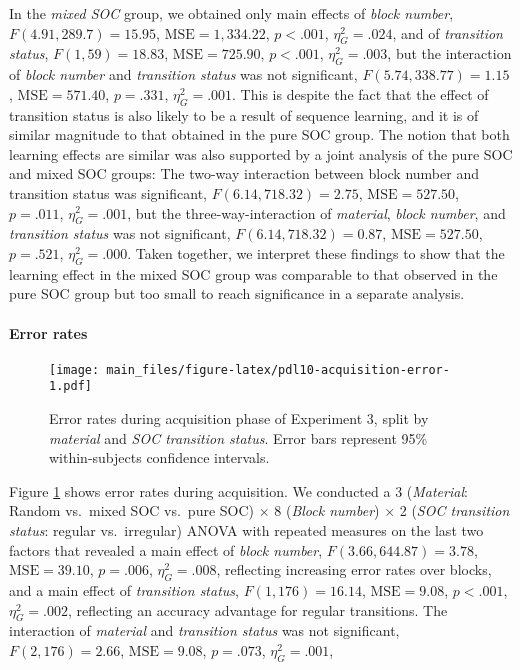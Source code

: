\documentclass[man]{apa6}
\theoremstyle{definition}
\theoremstyle{definition}
\theoremstyle{definition}
\theoremstyle{remark}
\begin{document}
In the \emph{mixed SOC} group, we obtained only main effects of
\emph{block number}, \(F(4.91, 289.7) = 15.95\),
\(\mathrm{MSE} = 1,334.22\), \(p < .001\), \(\eta^2_G = .024\), and of
\emph{transition status}, \(F(1, 59) = 18.83\),
\(\mathrm{MSE} = 725.90\), \(p < .001\), \(\eta^2_G = .003\), but the
interaction of \emph{block number} and \emph{transition status} was not
significant, \(F(5.74, 338.77) = 1.15\), \(\mathrm{MSE} = 571.40\),
\(p = .331\), \(\eta^2_G = .001\). This is despite the fact that the
effect of transition status is also likely to be a result of sequence
learning, and it is of similar magnitude to that obtained in the pure
SOC group. The notion that both learning effects are similar was also
supported by a joint analysis of the pure SOC and mixed SOC groups: The
two-way interaction between block number and transition status was
significant, \(F(6.14, 718.32) = 2.75\), \(\mathrm{MSE} = 527.50\),
\(p = .011\), \(\eta^2_G = .001\), but the three-way-interaction of
\emph{material}, \emph{block number}, and \emph{transition status} was
not significant, \(F(6.14, 718.32) = 0.87\), \(\mathrm{MSE} = 527.50\),
\(p = .521\), \(\eta^2_G = .000\). Taken together, we interpret these
findings to show that the learning effect in the mixed SOC group was
comparable to that observed in the pure SOC group but too small to reach
significance in a separate analysis.

\paragraph{Error rates}\label{error-rates-2}

\begin{figure}[htbp]
\centering
\texttt{[image: main\_files/figure-latex/pdl10-acquisition-error-1.pdf]}
\caption{\label{fig:pdl10-acquisition-error}Error rates during acquisition
phase of Experiment 3, split by \emph{material} and \emph{SOC transition
status}. Error bars represent 95\% within-subjects confidence
intervals.}
\end{figure}

Figure \ref{fig:pdl10-acquisition-error} shows error rates during
acquisition. We conducted a 3 (\emph{Material}: Random vs.~mixed SOC
vs.~pure SOC) \(\times\) 8 (\emph{Block number}) \(\times\) 2 (\emph{SOC
transition status}: regular vs.~irregular) ANOVA with repeated measures
on the last two factors that revealed a main effect of \emph{block
number}, \(F(3.66, 644.87) = 3.78\), \(\mathrm{MSE} = 39.10\),
\(p = .006\), \(\eta^2_G = .008\), reflecting increasing error rates
over blocks, and a main effect of \emph{transition status},
\(F(1, 176) = 16.14\), \(\mathrm{MSE} = 9.08\), \(p < .001\),
\(\eta^2_G = .002\), reflecting an accuracy advantage for regular
transitions. The interaction of \emph{material} and \emph{transition
status} was not significant, \(F(2, 176) = 2.66\),
\(\mathrm{MSE} = 9.08\), \(p = .073\), \(\eta^2_G = .001\),
\end{document}
